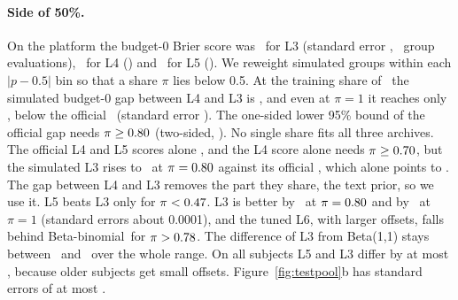 \documentclass{article}
\newcommand{\BB}{Beta-binomial}
\begin{document}
\paragraph{Side of 50\%.} On the platform the budget-0 Brier score was \SideBzeroLthree\ for L3 (standard error \SideBzeroLthreeSe, \SideBzeroLthreeGroups\ group evaluations), \SideBzeroLfour\ for L4 (\SideBzeroLfourSe) and \SideBzeroLfive\ for L5 (\SideBzeroLfiveSe). We reweight simulated groups within each $|p-0.5|$ bin so that a share $\pi$ lies below 0.5. At the training share of \SideTrainShare\ the simulated budget-0 gap between L4 and L3 is \SideGapLfourSimTrain, and even at $\pi=1$ it reaches only \SideGapLfourSimMax, below the official \SideGapLfour\ (standard error \SideGapLfourSe). The one-sided lower 95\% bound of the official gap needs $\pi\ge0.80$ (two-sided, \SidePiLowTwo). No single share fits all three archives. The official L4 and L5 scores alone \SidePiFromPhrase, and the L4 score alone needs $\pi\ge0.70$, but the simulated L3 rises to \SideLthreeSimAtLow\ at $\pi=0.80$ against its official \SideBzeroLthree, which alone points to \SidePiFromLthree. The gap between L4 and L3 removes the part they share, the text prior, so we use it. L5 beats L3 only for $\pi<0.47$. L3 is better by \SideFiveThreeLowAbs\ at $\pi=0.80$ and by \SideFiveThreeOneAbs\ at $\pi=1$ (standard errors about 0.0001), and the tuned L6, with larger offsets, falls behind \BB\ for $\pi>0.78$. The difference of L3 from Beta(1,1) stays between \SideThreeLo\ and \SideThreeHi\ over the whole range. On all subjects L5 and L3 differ by at most \SideAllLoAbs, because older subjects get small offsets. Figure~\ref{fig:testpool}b has standard errors of at most \SidePlotSe.
\end{document}
